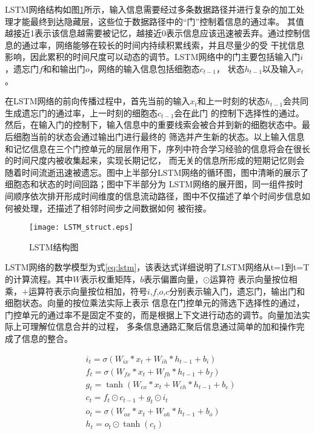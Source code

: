 LSTM网络结构如图\ref{fig:lstm}所示，输入信息需要经过多条数据路径并进行复杂的加工处理才能最终到达隐藏层，这些位于数据路径中的“门”控制着信息的通过率。
其值越接近1表示该信息越需要被记忆，越接近0表示信息应该迅速被丢弃。通过控制信息的通过率，网络能够在较长的时间内持续积累线索，并且尽量少的受
干扰信息影响，因此累积的时间尺度可以动态的调节。LSTM网络中的门主要包括输入门\(i\)，遗忘门\(f\)和和输出门\(o\)，网络的输入信息包括细胞态\(c_{t-1}\)，
状态\(h_{t-1}\)以及输入\(x_t\)。

在LSTM网络的前向传播过程中，首先当前的输入\(x_t\)和上一时刻的状态\(h_{t-1}\)会共同生成遗忘门的通过率，上一时刻的细胞态\(c_{t-1}\)会在此门
的控制下选择性的通过。然后，在输入门的控制下，输入信息中的重要线索会被合并到新的细胞状态中。最后细胞当前的状态会通过输出门进行最终的
筛选并产生新的状态。以上输入信息和记忆信息在三个门控单元的层层作用下，序列中符合学习经验的信息将会在很长的时间尺度内被收集起来，实现长期记忆，
而无关的信息所形成的短期记忆则会随着时间流逝迅速被遗忘。图中上半部分LSTM网络的循环图，图中清晰的展示了细胞态和状态的时间回路；图中下半部分为
LSTM网络的展开图，同一组件按时间顺序依次排开形成时间维度的信息流动路径，图中不仅描述了单个时间步信息如何被处理，还描述了相邻时间步之间数据如何
被衔接。

\begin{figure}
	\centering
	\texttt{[image: LSTM\_struct.eps]}
	\caption{LSTM结构图}
	\label{fig:lstm}
\end{figure}

LSTM网络的数学模型为式\ref{eq:lstm}，该表达式详细说明了LSTM网络从t=1到t=T的计算流程。其中\(W\)表示权重矩阵，\(b\)表示偏置向量，\(\odot\)运算符
表示向量按位相乘，\(+\)运算符表示向量按位相加，符号\(i\),\(f\),\(o\),\(c\)分别表示输入门，遗忘门，输出门和细胞状态。向量的按位乘法实际上表示
信息在门控单元的筛选下选择性的通过，门控单元的通过率不是固定不变的，而是根据上下文进行动态的调节。向量加法实际上可理解位信息合并的过程，
多条信息通路汇聚后信息通过简单的加和操作完成了信息的整合。

\begin{equation}\label{eq:lstm}
	\begin{split}
		&i_t = \sigma(W_{ix}*x_t + W_{ih}*h_{t-1} + b_i)	\\
		&f_t = \sigma(W_{fx}*x_t + W_{fh}*h_{t-1} + b_f)	\\
		&g_t = \tanh(W_{cx}*x_t + W_{ch}*h_{t-1} + b_c)					\\
		&c_t = f_t \odot c_{t-1} + g_t \odot i_t							\\	
		&o_t = \sigma(W_{ox}*x_{t} + W_{oh} * h_{t-1} + b_o)	\\
		&h_t = o_t \odot \tanh(c_{t})											\\												
	\end{split}
\end{equation}


